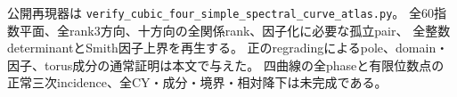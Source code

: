 公開再現器は \texttt{verify\_cubic\_four\_simple\_spectral\_curve\_atlas.py}。
全60指数平面、全rank3方向、十方向の全関係rank、因子化に必要な孤立pair、
全整数determinantとSmith因子上界を再生する。
正のregradingによるpole、domain・因子、torus成分の通常証明は本文で与えた。
四曲線の全phaseと有限位数点の正常三次incidence、全CY・成分・境界・相対降下は未完成である。
